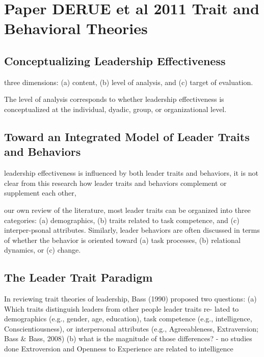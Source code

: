
\section{Paper DERUE et al 2011 Trait and Behavioral Theories}

\subsection{Conceptualizing Leadership Effectiveness} %
\label{sub:conceptualizing_leadership_effectiveness}

three dimensions:
(a) content, (b) level of analysis, and (c) target of evaluation.

The level of analysis corresponds to whether leadership effectiveness is conceptualized at the individual, dyadic, group, or organizational level.


\subsection{Toward an Integrated Model of Leader Traits and Behaviors} %
\label{sub:toward_an_integrated_model_of_leader_traits_and_behaviors}

leadership effectiveness is influenced by both leader traits and behaviors, it is not clear from this research how leader traits and behaviors complement or supplement each other,

our own review of the literature, most leader traits can be organized into three categories:
(a) demographics, (b) traits related to task competence, and (c) interper-psonal attributes. Similarly, leader behaviors are often discussed in terms of whether the behavior is oriented toward (a) task processes, (b) relational dynamics, or (c) change.




\subsection{The Leader Trait Paradigm} %
\label{sub:the_leader_trait_paradigm}

In reviewing trait theories of leadership, Bass (1990) proposed two questions: 
(a) Which traits distinguish leaders from other people
	 leader traits re- lated to demographics (e.g., gender, age, education), task competence (e.g., 	intelligence, Conscientiousness), or interpersonal attributes (e.g., Agreeableness, 	Extraversion; Bass \& Bass, 2008)
(b) what is the magnitude of those differences? -  no studies done
Extroversion and Openness to Experience are related to intelligence

